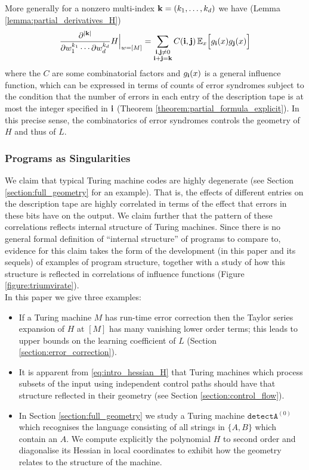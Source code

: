 \documentclass[english,letter paper,12pt,reqno]{article}
\theoremstyle{definition}
\newcommand{\detectA}{\texttt{detectA}}
\begin{document}
More generally for a nonzero multi-index $\bold{k} = (k_1,\ldots,k_d)$ we have (Lemma \ref{lemma:partial_derivatives_H})
\begin{equation}
\frac{\partial^{|\bold{k}|}}{\partial w_1^{k_1} \cdots \partial w_d^{k_d}} H \Bigr|_{w = [M]} = \sum_{\substack{\bold{i},\bold{j} \neq 0 \\ \bold{i} + \bold{j} = \bold{k}}} C(\bold{i}, \bold{j})\, \mathbb{E}_x\Big[ g_{\bold{i}}(x) g_{\bold{j}}(x) \Big]
\end{equation}
where the $C$ are some combinatorial factors and $g_{\bold{i}}(x)$ is a general influence function, which can be expressed in terms of counts of error syndromes subject to the condition that the number of errors in each entry of the description tape is at most the integer specified in $\bold{i}$ (Theorem \ref{theorem:partial_formula_explicit}). In this precise sense, the combinatorics of error syndromes controls the geometry of $H$ and thus of $L$.

\subsubsection{Programs as Singularities}\label{section:pas}

We claim that typical Turing machine codes are highly degenerate (see Section \ref{section:full_geometry} for an example). That is, the effects of different entries on the description tape are highly correlated in terms of the effect that errors in these bits have on the output. We claim further that the pattern of these correlations reflects internal structure of Turing machines. Since there is no general formal definition of ``internal structure'' of programs to compare to, evidence for this claim takes the form of the development (in this paper and its sequels) of examples of program structure, together with a study of how this structure is reflected in correlations of influence functions (Figure \ref{figure:triumvirate}).
\\

In this paper we give three examples:
\begin{itemize}
\item If a Turing machine $M$ has run-time error correction then the Taylor series expansion of $H$ at $[M]$ has many vanishing lower order terms; this leads to upper bounds on the learning coefficient of $L$ (Section \ref{section:error_correction}).
\item It is apparent from \eqref{eq:intro_hessian_H} that Turing machines which process subsets of the input using independent control paths should have that structure reflected in their geometry (see Section \ref{section:control_flow}).
\item In Section \ref{section:full_geometry} we study a Turing machine $\detectA^{(0)}$ which recognises the language consisting of all strings in $\{ A, B \}$ which contain an $A$. We compute explicitly the polynomial $H$ to second order and diagonalise its Hessian in local coordinates to exhibit how the geometry relates to the structure of the machine. 
\end{itemize}
\end{document}
